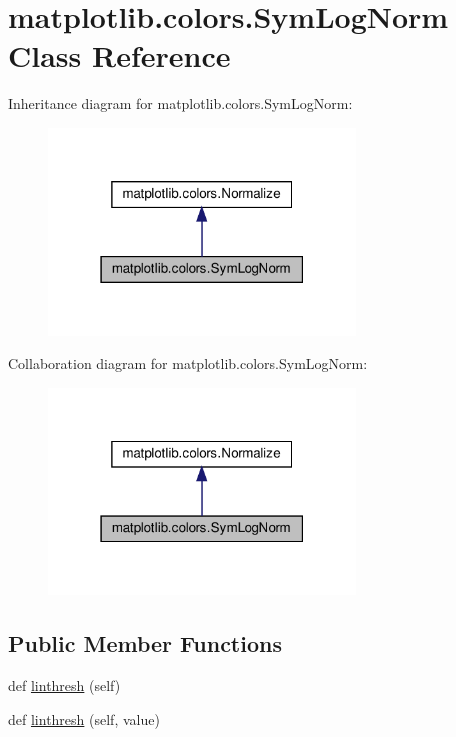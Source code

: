 \hypertarget{classmatplotlib_1_1colors_1_1SymLogNorm}{}\section{matplotlib.\+colors.\+Sym\+Log\+Norm Class Reference}
\label{classmatplotlib_1_1colors_1_1SymLogNorm}


Inheritance diagram for matplotlib.\+colors.\+Sym\+Log\+Norm\+:
\nopagebreak
\begin{figure}[H]
\begin{center}
\leavevmode
\includegraphics[width=231pt]{classmatplotlib_1_1colors_1_1SymLogNorm__inherit__graph}
\end{center}
\end{figure}


Collaboration diagram for matplotlib.\+colors.\+Sym\+Log\+Norm\+:
\nopagebreak
\begin{figure}[H]
\begin{center}
\leavevmode
\includegraphics[width=231pt]{classmatplotlib_1_1colors_1_1SymLogNorm__coll__graph}
\end{center}
\end{figure}
\subsection*{Public Member Functions}
\begin{DoxyCompactItemize}
\item 
def \hyperlink{classmatplotlib_1_1colors_1_1SymLogNorm_a76533c742be26b29dd7c97ab0dba0c06}{linthresh} (self)
\item 
def \hyperlink{classmatplotlib_1_1colors_1_1SymLogNorm_a5fed092ea45053336306e05e0cb773a0}{linthresh} (self, value)
\end{DoxyCompactItemize}
